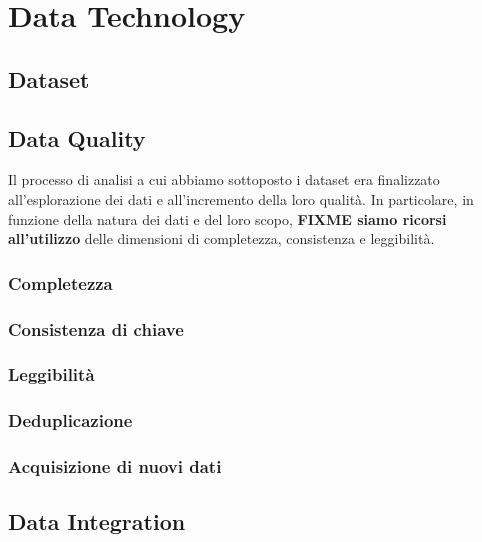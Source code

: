 \setcounter{chapter}{0}

\part{Data Technology}

\chapter{Dataset}

\chapter{Data Quality}
\label{chap:data-quality}
Il processo di analisi a cui abbiamo sottoposto i dataset era finalizzato 
all'esplorazione dei dati e all'incremento della loro qualità. In particolare, 
in funzione della natura dei dati e del loro scopo, \textbf{FIXME siamo ricorsi 
all'utilizzo} delle dimensioni di completezza, consistenza e leggibilità.


\section{Completezza}

\section{Consistenza di chiave}

\section{Leggibilità}

\section{Deduplicazione}

\section{Acquisizione di nuovi dati}

\chapter{Data Integration}
\label{chap:data-integration}


